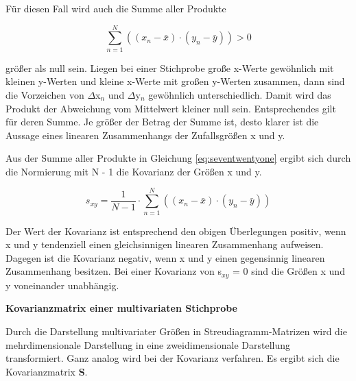\noindent F\"{u}r diesen Fall wird auch die Summe aller Produkte

\begin{equation}\label{eq:seventwentyone}
\sum _{n=1}^{N}\left((x_{n} -\bar{x})\cdot (y_{n} -\bar{y})\right) >0
\end{equation}

\noindent gr\"{o}{\ss}er als null sein. Liegen bei einer Stichprobe gro{\ss}e x-Werte gew\"{o}hnlich mit kleinen y-Werten und kleine x-Werte mit gro{\ss}en y-Werten zusammen, dann sind die Vorzeichen von $\Delta$x$_{n}$ und $\Delta$y$_{n}$ gew\"{o}hnlich unterschiedlich. Damit wird das Produkt der Abweichung vom Mittelwert kleiner null sein. Entsprechendes gilt f\"{u}r deren Summe. Je gr\"{o}{\ss}er der Betrag der Summe ist, desto klarer ist die Aussage eines linearen Zusammenhangs der Zufallsgr\"{o}{\ss}en x und y.

\noindent Aus der Summe aller Produkte in Gleichung \eqref{eq:seventwentyone} ergibt sich durch die Normierung mit N - 1 die Kovarianz der Gr\"{o}{\ss}en x und y.

\begin{equation}\label{eq:seventwentytwo}
s_{xy} =\dfrac{1}{N-1} \cdot \sum _{n=1}^{N}\left((x_{n} -\bar{x})\cdot (y_{n} -\bar{y})\right) 
\end{equation}

\noindent Der Wert der Kovarianz ist entsprechend den obigen \"{U}berlegungen positiv, wenn x und y tendenziell einen gleichsinnigen linearen Zusammenhang aufweisen. Dagegen ist die Kovarianz negativ, wenn x und y einen gegensinnig linearen Zusammenhang besitzen. Bei einer Kovarianz von s$_{xy}$ = 0 sind die Gr\"{o}{\ss}en x und y voneinander unabh\"{a}ngig. \bigskip

{\selectfont
\noindent\textbf{Kovarianzmatrix einer multivariaten Stichprobe}}\smallskip

\noindent Durch die Darstellung multivariater Gr\"{o}{\ss}en in Streudiagramm-Matrizen wird die mehrdimensionale Darstellung in eine zweidimensionale Darstellung transformiert. Ganz analog wird bei der Kovarianz verfahren. Es ergibt sich die Kovarianzmatrix \textbf{S}.

